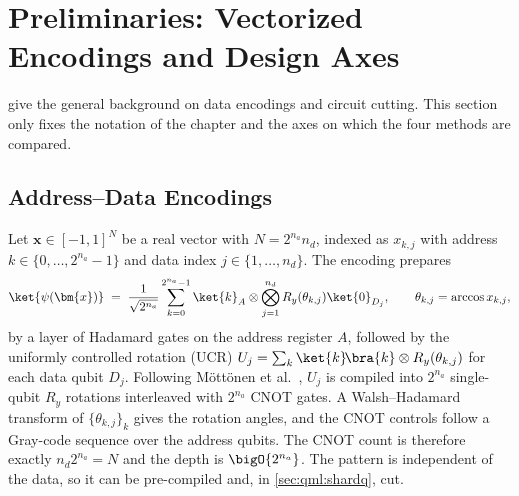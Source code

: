 \section{Preliminaries: Vectorized Encodings and Design Axes}\label{sec:qml:prelim}

 give the general background on data encodings and circuit cutting. This section only fixes the notation of the chapter and the axes on which the four methods are compared.

\subsection{Address--Data Encodings}\label{sec:qml:prelim:ucr}

Let $\bm{x} \in [-1,1]^{N}$ be a real vector with $N = 2^{n_a} n_d$, indexed as $x_{k,j}$ with address $k \in \{0,\dots,2^{n_a}-1\}$ and data index $j \in \{1,\dots,n_d\}$. The \qcrank{} encoding \cite{balewski2024qcrank} prepares
\begin{equation}\label{eq:qml:qcrank}
\ket{\psi(\bm{x})} \;=\; \frac{1}{\sqrt{2^{n_a}}} \sum_{k=0}^{2^{n_a}-1} \ket{k}_A \otimes \bigotimes_{j=1}^{n_d} R_y(\theta_{k,j})\ket{0}_{D_j},
\qquad \theta_{k,j} = \arccos x_{k,j},
\end{equation}
by a layer of Hadamard gates on the address register $A$, followed by the uniformly controlled rotation (UCR) $U_j = \sum_k \ket{k}\!\bra{k} \otimes R_y(\theta_{k,j})$ for each data qubit $D_j$. Following Möttönen et al.~\cite{mottonen2004ucr}, $U_j$ is compiled into $2^{n_a}$ single-qubit $R_y$ rotations interleaved with $2^{n_a}$ CNOT gates. A Walsh--Hadamard transform of $\{\theta_{k,j}\}_k$ gives the rotation angles, and the CNOT controls follow a Gray-code sequence over the address qubits. The CNOT count is therefore exactly $n_d 2^{n_a} = N$ and the depth is $\bigO{2^{n_a}}$. The pattern is independent of the data, so it can be pre-compiled and, in \cref{sec:qml:shardq}, cut.

